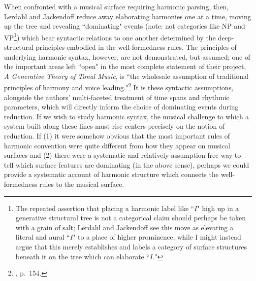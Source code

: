 When confronted with a musical surface requiring harmonic parsing, then, Lerdahl and Jackendoff reduce away elaborating harmonies one at a time, moving up the tree and revealing ``dominating" events (note: not categories like NP and VP\footnote{The repeated assertion that placing a harmonic label like ``$I$" high up in a generative structural tree is not a categorical claim should perhaps be taken with a grain of salt; Lerdahl and Jackendoff see this move as elevating a literal and aural ``$I$" to a place of higher prominence, while I might instead argue that this merely establishes and labels a category of surface structures beneath it on the tree which can elaborate ``$I$."}) which bear syntactic relations to one another determined by the deep-structural principles embodied in the well-formedness rules.  The principles of underlying harmonic syntax, however, are not demonstrated, but assumed; one of the important areas left ``open" in the most complete statement of their project, \emph{A Generative Theory of Tonal Music}, is ``the wholesale assumption of traditional principles of harmony and voice leading."\footnote{\cite{lj1983}, p.\ 154.}  It is these syntactic assumptions, alongside the authors' multi-faceted treatment of time spans and rhythmic parameters, which will directly inform the choice of dominating events during reduction.  If we wish to study harmonic syntax, the musical challenge to which a system built along these lines must rise centers precisely on the notion of reduction.  If (1) it were somehow obvious that the most important rules of harmonic convention were quite different from how they appear on musical surfaces and (2) there were a systematic and relatively assumption-free way to tell which surface features are dominating (in the above sense), perhaps we could provide a systematic account of harmonic structure which connects the well-formedness rules to the musical surface.

